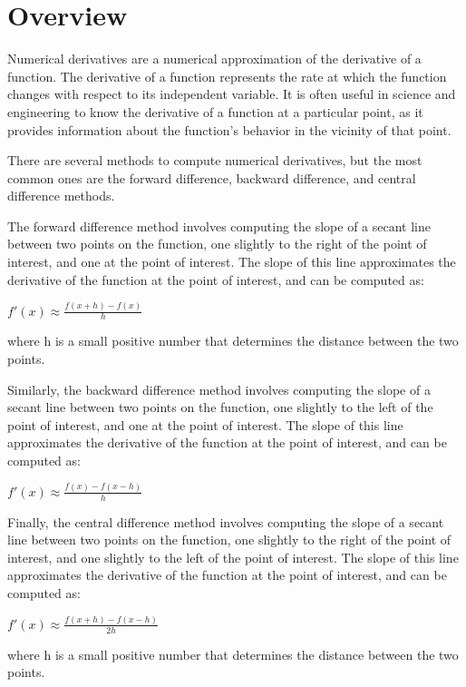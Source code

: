 \documentclass[letterpaper,10pt,english]{sphinxmanual}
\begin{document}
\section{Overview}
\label{\detokenize{docDerivative:overview}}
\sphinxAtStartPar
Numerical derivatives are a numerical approximation of the derivative of a function. The derivative of a function represents the rate at which the function changes with respect to its independent variable. It is often useful in science and engineering to know the derivative of a function at a particular point, as it provides information about the function’s behavior in the vicinity of that point.

\sphinxAtStartPar
There are several methods to compute numerical derivatives, but the most common ones are the forward difference, backward difference, and central difference methods.

\sphinxAtStartPar
The forward difference method involves computing the slope of a secant line between two points on the function, one slightly to the right of the point of interest, and one at the point of interest. The slope of this line approximates the derivative of the function at the point of interest, and can be computed as:

\sphinxAtStartPar
\(f'(x) ≈ \frac{f(x + h) - f(x)}{h}\)

\sphinxAtStartPar
where h is a small positive number that determines the distance between the two points.

\sphinxAtStartPar
Similarly, the backward difference method involves computing the slope of a secant line between two points on the function, one slightly to the left of the point of interest, and one at the point of interest. The slope of this line approximates the derivative of the function at the point of interest, and can be computed as:

\sphinxAtStartPar
\(f'(x) ≈ \frac{f(x) - f(x - h)}{h}\)

\sphinxAtStartPar
Finally, the central difference method involves computing the slope of a secant line between two points on the function, one slightly to the right of the point of interest, and one slightly to the left of the point of interest. The slope of this line approximates the derivative of the function at the point of interest, and can be computed as:

\sphinxAtStartPar
\(f'(x) ≈ \frac{f(x + h) - f(x - h)}{2h}\)

\sphinxAtStartPar
where h is a small positive number that determines the distance between the two points.
\end{document}
